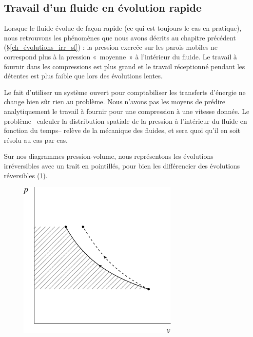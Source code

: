 	\subsection{Travail d’un fluide en évolution rapide}
	
		Lorsque le fluide évolue de façon rapide (ce qui est toujours le cas en pratique), nous retrouvons les phénomènes que nous avons décrits au chapitre précédent (\S\ref{ch_évolutions_irr_sf}) : la pression exercée sur les parois mobiles ne correspond plus à la pression «~moyenne~» à l’intérieur du fluide. Le travail à fournir dans les compressions est plus grand et le travail réceptionné pendant les détentes est plus faible que lors des évolutions lentes.
		
		Le fait d’utiliser un système ouvert pour comptabiliser les transferts d’énergie ne change bien sûr rien au problème. Nous n’avons pas les moyens de prédire analytiquement le travail à fournir pour une compression à une vitesse donnée. Le problème –calculer la distribution spatiale de la pression à l’intérieur du fluide en fonction du temps– relève de la mécanique des fluides, et sera quoi qu’il en soit résolu au cas-par-cas.
		
		Sur nos diagrammes pression-volume, nous représentons les évolutions irréversibles avec un trait en pointillés, pour bien les différencier des évolutions réversibles (\cref{fig_pv_evolution_irr_so}).
		
		\begin{figure}
			\begin{center}
				\includegraphics[width=8cm]{images/pv_compression_irreversible_so.png}
			\end{center}
			\label{fig_pv_evolution_irr_so}
		\end{figure}
	
